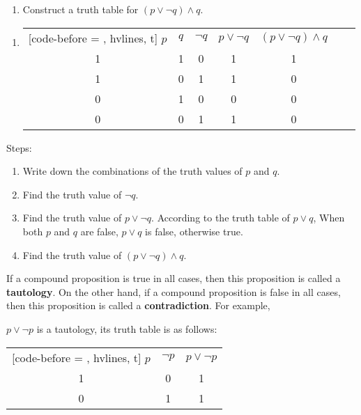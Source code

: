 \documentclass{report}
\begin{document}
\vspace{0.5cm}
\begin{enumerate}[label=\textbf{Example \arabic*}, leftmargin=*, start=10]
    \item Construct a truth table for $(p \lor \neg q) \land q$.
\end{enumerate}
\begin{enumerate}[label=\textbf{Sol.}, leftmargin=*]
    \item
          \begin{NiceTabular}{|c|c|c|c|c|c|c|}[code-before = , hvlines, t]
              $p$ & $q$ & $\neg q$ & $p \lor \neg q$ & $(p \lor \neg q) \land q$ \\
              1   & 1   & 0        & 1               & 1                         \\
              1   & 0   & 1        & 1               & 0                         \\
              0   & 1   & 0        & 0               & 0                         \\
              0   & 0   & 1        & 1               & 0                         \\
          \end{NiceTabular}
\end{enumerate}

Steps:
\begin{enumerate}[leftmargin=*, label=\indent(\arabic*)]
    \item Write down the combinations of the truth values of $p$ and $q$.
    \item Find the truth value of $\neg q$.
    \item Find the truth value of $p \lor \neg q$. According to the truth table of $p
              \lor q$, When both $p$ and $q$ are false, $p \lor q$ is false, otherwise true.
    \item Find the truth value of $(p \lor \neg q) \land q$.
\end{enumerate}

If a compound proposition is true in all cases, then this proposition is called
a \textbf{tautology}. On the other hand, if a compound proposition is false in
all cases, then this proposition is called a \textbf{contradiction}. For
example,

$p \lor \neg p$ is a tautology, its truth table is as follows:
\begin{center}
    \begin{NiceTabular}{|c|c|c|}[code-before = , hvlines, t]
        $p$ & $\neg p$ & $p \lor \neg p$ \\
        1   & 0        & 1               \\
        0   & 1        & 1               \\
    \end{NiceTabular}
\end{center}
\end{document}
